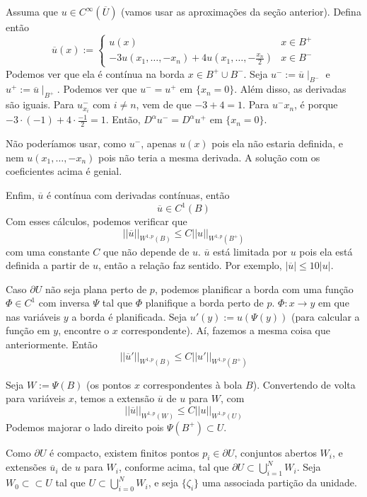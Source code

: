 \documentclass[11pt]{article}
\newcommand{\pu}{\partial U}
\begin{document}
Assuma que \( u \in C^\infty (\overline{U}) \) (vamos usar as aproximações da seção anterior). Defina então \[ \overline{u}(x) := \begin{cases}
	u(x) & x \in B^+ \\
	-3u(x_1, \ldots, -x_n) + 4u(x_1, \ldots, -\frac{x_n}{2}) & x \in B^-
\end{cases} \] Podemos ver que ela é contínua na borda \( x \in B^+ \cup B^- \). Seja \( u^- := \overline{u}\mid_{B^-} \) e \( u^+ := \overline{u}\mid_{B^+} \).  Podemos ver que \( u^- = u^+ \) em \( \{x_n=0\}\). Além disso, as derivadas são iguais. Para \( u^-_{x_i} \) com \( i \neq n \), vem de que \( -3 + 4 = 1 \). Para \( u^-{x_n} \), é porque \( -3 \cdot (-1) + 4 \cdot \frac{-1}{2} = 1 \). Então, \( D^\alpha u^- = D^\alpha u^+ \) em \( \{x_n=0\} \).

Não poderíamos usar, como $ u^- $, apenas $ u(x) $ pois ela não estaria definida, e nem $ u(x_1,\ldots, -x_n) $ pois não teria a mesma derivada. A solução com os coeficientes acima é genial.


Enfim, $ \overline{u} $ é contínua com derivadas contínuas, então \[ \overline{u} \in C^1(B) \]
Com esses cálculos, podemos verificar que \[ ||\overline{u}||_{W^{1,p}(B)} \leq C ||u||_{W^{1,p}(B^+)} \] com uma constante \( C \) que não depende de \( u \). $\overline{u} $ está limitada por $u$ pois ela está definida a partir de $u$, então a relação faz sentido. Por exemplo, $|\overline{u}| \leq 10  |u| $.

Caso \( \pu \) não seja plana perto de \( p \), podemos planificar a borda com uma função \( \Phi \in C^1 \) com inversa \( \Psi \) tal que \( \Phi \) planifique a borda perto de \( p \).
\( \Phi: x \rightarrow y \) em que nas variáveis \( y \) a borda é planificada. Seja \( u'(y) := u(\Psi(y)) \) (para calcular a função em \( y \), encontre o \( x \) correspondente). Aí, fazemos a mesma coisa que anteriormente. Então \[ ||\overline{u}'||_{W^{1,p}(B)} \leq C ||u'||_{W^{1,p}(B^+)} \]

Seja \( W:= \Psi(B) \) (os pontos \( x \) correspondentes à bola \( B \)). Convertendo de volta para variáveis \( x \), temos a extensão \( \overline{u} \) de \( u \) para \( W \), com \[ ||\overline{u}||_{W^{1,p}(W)} \leq C ||u||_{W^{1,p}(U)} \] Podemos majorar o lado direito pois \( \Psi(B^+) \subset  U  \).

Como \( \pu \) é compacto, existem finitos pontos \( p_i \in \pu \), conjuntos abertos \( W_i \), e extensões \( \overline{u}_i \) de \( u \) para \( W_i \), conforme acima, tal que \( \pu \subset \bigcup_{i=1}^N W_i \). Seja \( W_0 \subset\subset U \) tal que \( U \subset \bigcup_{i=0}^N W_i \), e seja \( \{ \zeta_i \} \) uma associada partição da unidade.
\end{document}
